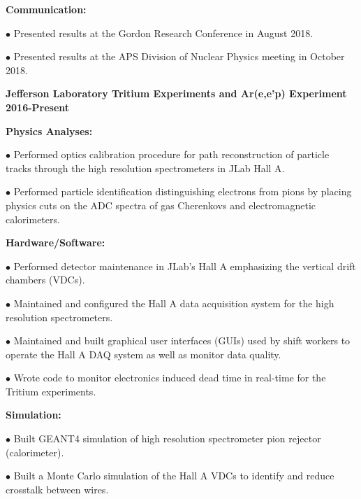 \documentclass[letterpaper,10pt]{article}
\renewenvironment{itemize}{
  \begin{list}{}{
    \setlength{\leftmargin}{1.5em}
  }
}{
  \end{list}
}
\begin{document}
{\begin{itemize}
\begin{itemize}
			\item \textbf{Communication:}
			\begin{itemize}\itemsep5pt
				\item $\bullet$ Presented results at the Gordon Research Conference in August 2018.
				\item $\bullet$ Presented results at the APS Division of Nuclear Physics meeting in October 2018.
			\end{itemize}
	\end{itemize}
	
	\vspace{3mm}
	
 \item {\large {\bf Jefferson Laboratory Tritium Experiments and Ar(e,e'p) Experiment 2016-Present} }

 \begin{itemize}\itemsep5pt \parskip0pt 
  \item \textbf{Physics Analyses:}
    \begin{itemize}\itemsep5pt \parskip0pt 
     \item $\bullet$ Performed optics calibration procedure for path reconstruction of particle tracks through the high resolution spectrometers in JLab Hall A.
     \item $\bullet$ Performed particle identification distinguishing electrons from pions by placing physics cuts on the ADC spectra of gas Cherenkovs and electromagnetic calorimeters.
     \end{itemize}

  \item \textbf{Hardware/Software:}
    \begin{itemize}\itemsep5pt \parskip0pt 
     \item $\bullet$ Performed detector maintenance in JLab's Hall A emphasizing the vertical drift chambers (VDCs). 
     \item $\bullet$ Maintained and configured the Hall A data acquisition system for the high resolution spectrometers.
     \item $\bullet$ Maintained and built graphical user interfaces (GUIs) used by shift workers to operate the Hall A DAQ system as well as monitor data quality.
     \item $\bullet$ Wrote code to monitor electronics induced dead time in real-time for the Tritium experiments.
    \end{itemize}
    
   \item \textbf{Simulation:}
     \begin{itemize}\itemsep5pt \parskip0pt 
      \item $\bullet$ Built GEANT4 simulation of high resolution spectrometer pion rejector (calorimeter).
      \item $\bullet$ Built a Monte Carlo simulation of the Hall A VDCs to identify and reduce crosstalk between wires. 
     \end{itemize} 
     

\end{itemize}
\end{itemize}}
\end{document}
